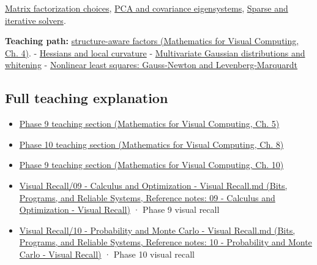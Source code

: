 \hypertarget{appendix-50d2ea3c9b26-used-by}{}

\hyperref[appendix-221a483bec2d]{Matrix factorization choices}, \hyperref[appendix-ad175ef3c5bf]{PCA and covariance eigensystems}, \hyperref[appendix-67c87a3d9e94]{Sparse and iterative solvers}.

\textbf{Teaching path:} \href{../02-Mathematics-for-Visual-Computing/main.pdf\#nameddest=01-foundations-i-ch020-structure-makes-a-decomposition-a-better-tool-than-generic-elimination}{structure-aware factors (Mathematics for Visual Computing, Ch. 4)}. - \hyperref[appendix-6ac071f8b50c]{Hessians and local curvature} - \hyperref[appendix-12bbe185dbe5]{Multivariate Gaussian distributions and whitening} - \hyperref[appendix-2c2df8345991]{Nonlinear least squares: Gauss-Newton and Levenberg-Marquardt}

\subsection{Full teaching explanation}\label{appendix-50d2ea3c9b26-full-teaching-explanation}

\hypertarget{appendix-50d2ea3c9b26-full-teaching-explanation}{}

\begin{itemize}
\tightlist
\item
  \href{../02-Mathematics-for-Visual-Computing/main.pdf\#nameddest=02-foundations-ii-ch021-jacobians-curvature-and-local-approximation}{Phase 9 teaching section (Mathematics for Visual Computing, Ch. 5)}
\item
  \href{../02-Mathematics-for-Visual-Computing/main.pdf\#nameddest=02-foundations-ii-ch024-waiting-times-event-counts-and-covariance-geometry}{Phase 10 teaching section (Mathematics for Visual Computing, Ch. 8)}
\item
  \href{../02-Mathematics-for-Visual-Computing/main.pdf\#nameddest=02-foundations-ii-ch026-optimization-and-inverse-problems}{Phase 9 teaching section (Mathematics for Visual Computing, Ch. 10)}
\item
  \href{../01-Bits-Programs-and-Reliable-Systems/main.pdf\#nameddest=appendix-adf48f5dc5c1}{Visual Recall/09 - Calculus and Optimization - Visual Recall.md (Bits, Programs, and Reliable Systems, Reference notes: 09 - Calculus and Optimization - Visual Recall)} · Phase 9 visual recall
\item
  \href{../01-Bits-Programs-and-Reliable-Systems/main.pdf\#nameddest=appendix-cb5af353ef77}{Visual Recall/10 - Probability and Monte Carlo - Visual Recall.md (Bits, Programs, and Reliable Systems, Reference notes: 10 - Probability and Monte Carlo - Visual Recall)} · Phase 10 visual recall
\end{itemize}
